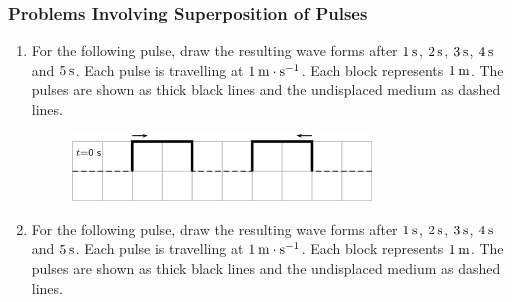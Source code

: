             \subsubsection{ Problems Involving Superposition of Pulses }
            \nopagebreak
            \label{m38802*id316401}\begin{enumerate}[noitemsep, label=\textbf{\arabic*}. ] 
            \label{m38802*uid55}\item For the following pulse, draw the resulting wave forms after $1\phantom{\rule{2pt}{0ex}}\mathrm{s}$, $2\phantom{\rule{2pt}{0ex}}\mathrm{s}$, $3\phantom{\rule{2pt}{0ex}}\mathrm{s}$, $4\phantom{\rule{2pt}{0ex}}\mathrm{s}$ and $5\phantom{\rule{2pt}{0ex}}\mathrm{s}$. Each pulse is travelling at $1\phantom{\rule{2pt}{0ex}}\mathrm{m}\ensuremath{\cdot}\mathrm{s}{}^{-1}$. Each block represents $1\phantom{\rule{2pt}{0ex}}\mathrm{m}$. The pulses are shown as thick black lines and the undisplaced medium as dashed lines.
    \setcounter{subfigure}{0}
	\begin{figure}[H] %
    \begin{center}
    \label{m38802*id316460!!!underscore!!!media}\label{m38802*id316460!!!underscore!!!printimage}\includegraphics[width=300px]{col11305.imgs/m38802_PG10C4_024.png} %
      \vspace{2pt}
    \vspace{.1in}
    \end{center}
 \end{figure}               \label{m38802*uid57}\item For the following pulse, draw the resulting wave forms after $1\phantom{\rule{2pt}{0ex}}\mathrm{s}$, $2\phantom{\rule{2pt}{0ex}}\mathrm{s}$, $3\phantom{\rule{2pt}{0ex}}\mathrm{s}$, $4\phantom{\rule{2pt}{0ex}}\mathrm{s}$ and $5\phantom{\rule{2pt}{0ex}}\mathrm{s}$. Each pulse is travelling at $1\phantom{\rule{2pt}{0ex}}\mathrm{m}\ensuremath{\cdot}\mathrm{s}{}^{-1}$. Each block represents $1\phantom{\rule{2pt}{0ex}}\mathrm{m}$. The pulses are shown as thick black lines and the undisplaced medium as dashed lines.
    \setcounter{subfigure}{0}
	\begin{figure}[H] %
    \begin{center}

\end{center}
\end{figure}
\end{enumerate}
